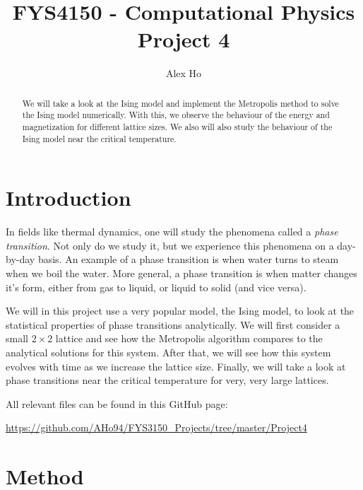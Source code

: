 \documentclass[12pt]{article}
\author{Alex Ho}
\title{FYS4150 - Computational Physics \\ Project 4}
\begin{document}
\maketitle
\begin{abstract}
We will take a look at the Ising model and implement the Metropolis method to solve the Ising model numerically. With this, we observe the behaviour of the energy and magnetization for different lattice sizes. We also will also study the behaviour of the Ising model near the critical temperature.
\end{abstract}
\newpage
\tableofcontents
\newpage
\section{Introduction} \label{section:intro}
In fields like thermal dynamics, one will study the phenomena called a \emph{phase transition}. Not only do we study it, but we experience this phenomena on a day-by-day basis. An example of a phase transition is when water turns to steam when we boil the water. More general, a phase transition is when matter changes it's form, either from gas to liquid, or liquid to solid (and vice versa).

We will in this project use a very popular model, the Ising model, to look at the statistical properties of phase transitions analytically. We will first consider a small $2\times 2$ lattice and see how the Metropolis algorithm compares to the analytical solutions for this system. After that, we will see how this system evolves with time as we increase the lattice size. Finally, we will take a look at phase transitions near the critical temperature for very, very large lattices.

All relevant files can be found in this GitHub page:

\url{https://github.com/AHo94/FYS3150_Projects/tree/master/Project4}


\section{Method} \label{section:methods}
\end{document}
